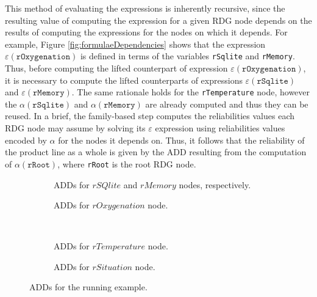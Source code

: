 This method of evaluating the expressions is inherently recursive, since the
resulting value of computing the expression for a given RDG node depends on the
results of computing the expressions for the nodes on which it depends.  For
example, Figure \ref{fig:formulaeDependencies} shows that the expression
$\varepsilon(\mathtt{rOxygenation})$ is defined in terms of the variables
\texttt{rSqlite} and \texttt{rMemory}.  Thus, before computing the lifted
counterpart of expression $\varepsilon(\mathtt{rOxygenation})$, it is necessary
to compute the lifted counterparts of expressions
$\varepsilon(\mathtt{rSqlite})$ and $\varepsilon(\mathtt{rMemory})$. The same
rationale holds for the \texttt{rTemperature} node, however the
$\alpha(\mathtt{rSqlite})$ and $\alpha(\mathtt{rMemory})$ are already computed and
thus they can be reused. In a brief,
the family-based step computes the reliabilities values each RDG node may assume
by solving its $\varepsilon$ expression using reliabilities values encoded by
$\alpha$ for the nodes it depends on. Thus, it follows that the reliability of
the product line as a whole is given by the ADD resulting from the computation
of $\alpha({\mathtt{rRoot}})$, where \texttt{rRoot} is the root RDG node.

\begin{figure}[p]
\centering
\begin{subfigure}[t]{0.7\columnwidth}
\resizebox{\linewidth}{!}{}
\caption{ADDs for $rSQlite$ and $rMemory$ nodes, respectively.}
\label{fig:addSqliteMemory}
\end{subfigure}
\vspace{0.5cm}

\begin{subfigure}[b]{0.40\textwidth}
\resizebox{\columnwidth}{!}{}
\caption{ADDs for $rOxygenation$ node.}
\label{fig:addOxygenation}
\end{subfigure}
~
\begin{subfigure}[b]{0.40\textwidth}
\resizebox{\columnwidth}{!}{}
\caption{ADDs for $rTemperature$ node.}
\label{fig:addTemperature}
\end{subfigure}
\vspace{0.5cm}


\begin{subfigure}[b]{\textwidth}
\centering
\resizebox{9cm}{!}{}
\caption{ADDs for $rSituation$ node.}
\label{fig:addSituation}
\end{subfigure}

\caption{ADDs for the running example.}
\label{fig:addRunningExample}
\end{figure}

